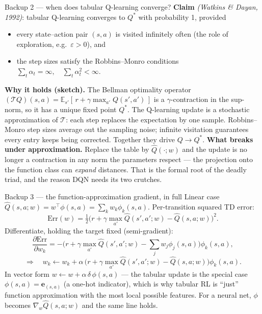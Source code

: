 \documentclass[10pt, aspectratio=169]{beamer}
\newcommand{\paper}[1]{\textcolor{mLightBrown}{\small\textit{(#1)}}}
\begin{document}
\begin{frame}{Backup 2 --- when does tabular Q-learning converge?}
\footnotesize
\textbf{Claim} \paper{Watkins \& Dayan, 1992}: tabular Q-learning converges to $Q^*$ with probability 1, provided
\begin{itemize}\setlength\itemsep{2pt}
\item every state--action pair $(s,a)$ is visited \alert{infinitely often} (the role of exploration, e.g.\ $\varepsilon>0$), and
\item the step sizes satisfy the Robbins--Monro conditions $\sum_t \alpha_t = \infty,\quad \sum_t \alpha_t^2 < \infty$.
\end{itemize}
\medskip
\textbf{Why it holds (sketch).} The Bellman optimality operator
$(\mathcal{T}Q)(s,a) = \mathbb{E}_{s'}[\,r + \gamma\max_{a'}Q(s',a')\,]$
is a $\gamma$-contraction in the sup-norm, so it has a unique fixed point $Q^*$. The Q-learning update is a \alert{stochastic approximation} of $\mathcal{T}$: each step replaces the expectation by one sample. Robbins--Monro step sizes average out the sampling noise; infinite visitation guarantees every entry keeps being corrected. Together they drive $Q \to Q^*$.
\medskip
\textbf{What breaks under approximation.} Replace the table by $\hat Q(\cdot;w)$ and the update is no longer a contraction in any norm the parameters respect --- the projection onto the function class can \emph{expand} distances. That is the formal root of the deadly triad, and the reason DQN needs its two crutches.
\end{frame}

\begin{frame}{Backup 3 --- the function-approximation gradient, in full}
\footnotesize
Linear case $\hat Q(s,a;w) = w^\top \phi(s,a) = \sum_k w_k \phi_k(s,a)$. Per-transition squared TD error:
\[
\text{Err}(w) = \tfrac12\Big(r + \gamma\max_{a'}\hat Q(s',a';w) - \hat Q(s,a;w)\Big)^2.
\]
Differentiate, holding the target fixed (semi-gradient):
\[
\frac{\partial \text{Err}}{\partial w_k}
= -\Big(r + \gamma\max_{a'}\hat Q(s',a';w) - \textstyle\sum_j w_j\phi_j(s,a)\Big)\phi_k(s,a),
\]
\[
\Rightarrow\quad w_k \leftarrow w_k + \alpha\,\Big(r + \gamma\max_{a'}\hat Q(s',a';w) - \hat Q(s,a;w)\Big)\phi_k(s,a).
\]
\medskip
In vector form $w \leftarrow w + \alpha\,\delta\,\phi(s,a)$ --- the tabular update is the special case $\phi(s,a)=\mathbf{e}_{(s,a)}$ (a one-hot indicator), which is why tabular RL is ``just'' function approximation with the most local possible features. For a neural net, $\phi$ becomes $\nabla_w \hat Q(s,a;w)$ and the same line holds.
\end{frame}
\end{document}
